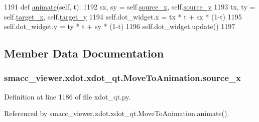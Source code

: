 \begin{DoxyCode}
1191     \textcolor{keyword}{def }\hyperlink{classsmacc__viewer_1_1xdot_1_1xdot__qt_1_1MoveToAnimation_ad0a2002a7f8a353483cf5397fcafaec7}{animate}(self, t):
1192         sx, sy = self.\hyperlink{classsmacc__viewer_1_1xdot_1_1xdot__qt_1_1MoveToAnimation_a663031c3ed4dda5b36e80d8538fb5639}{source\_x}, self.\hyperlink{classsmacc__viewer_1_1xdot_1_1xdot__qt_1_1MoveToAnimation_a2f112551579377e84006d0fa11502e45}{source\_y}
1193         tx, ty = self.\hyperlink{classsmacc__viewer_1_1xdot_1_1xdot__qt_1_1MoveToAnimation_a7a7a24555d78e358db021b1685d35916}{target\_x}, self.\hyperlink{classsmacc__viewer_1_1xdot_1_1xdot__qt_1_1MoveToAnimation_adf69b91918027d26503debdd035b822c}{target\_y}
1194         self.dot\_widget.x = tx * t + sx * (1-t)
1195         self.dot\_widget.y = ty * t + sy * (1-t)
1196         self.dot\_widget.update()
1197 
\end{DoxyCode}


\subsection{Member Data Documentation}
\subsubsection[{\texorpdfstring{source\+\_\+x}{source_x}}]{\setlength{\rightskip}{0pt plus 5cm}smacc\+\_\+viewer.\+xdot.\+xdot\+\_\+qt.\+Move\+To\+Animation.\+source\+\_\+x}\hypertarget{classsmacc__viewer_1_1xdot_1_1xdot__qt_1_1MoveToAnimation_a663031c3ed4dda5b36e80d8538fb5639}{}\label{classsmacc__viewer_1_1xdot_1_1xdot__qt_1_1MoveToAnimation_a663031c3ed4dda5b36e80d8538fb5639}


Definition at line 1186 of file xdot\+\_\+qt.\+py.



Referenced by smacc\+\_\+viewer.\+xdot.\+xdot\+\_\+qt.\+Move\+To\+Animation.\+animate().

